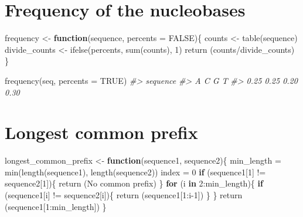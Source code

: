 \documentclass[
]{book}
\newenvironment{Shaded}{\begin{snugshade}}{\end{snugshade}}
\newcommand{\AttributeTok}[1]{\textcolor[rgb]{0.77,0.63,0.00}{#1}}
\newcommand{\CommentTok}[1]{\textcolor[rgb]{0.56,0.35,0.01}{\textit{#1}}}
\newcommand{\ConstantTok}[1]{\textcolor[rgb]{0.00,0.00,0.00}{#1}}
\newcommand{\ControlFlowTok}[1]{\textcolor[rgb]{0.13,0.29,0.53}{\textbf{#1}}}
\newcommand{\DecValTok}[1]{\textcolor[rgb]{0.00,0.00,0.81}{#1}}
\newcommand{\FunctionTok}[1]{\textcolor[rgb]{0.00,0.00,0.00}{#1}}
\newcommand{\NormalTok}[1]{#1}
\newcommand{\OtherTok}[1]{\textcolor[rgb]{0.56,0.35,0.01}{#1}}
\newcommand{\SpecialCharTok}[1]{\textcolor[rgb]{0.00,0.00,0.00}{#1}}
\newcommand{\StringTok}[1]{\textcolor[rgb]{0.31,0.60,0.02}{#1}}
\begin{document}
\hypertarget{frequency-of-the-nucleobases}{%
\section{Frequency of the nucleobases}\label{frequency-of-the-nucleobases}}

\begin{Shaded}
\begin{Highlighting}[]
\NormalTok{frequency }\OtherTok{\textless{}{-}} \ControlFlowTok{function}\NormalTok{(sequence, }\AttributeTok{percents =} \ConstantTok{FALSE}\NormalTok{)\{}
\NormalTok{  counts }\OtherTok{\textless{}{-}} \FunctionTok{table}\NormalTok{(sequence)}
\NormalTok{  divide\_counts }\OtherTok{\textless{}{-}} \FunctionTok{ifelse}\NormalTok{(percents, }\FunctionTok{sum}\NormalTok{(counts), }\DecValTok{1}\NormalTok{)}
  \FunctionTok{return}\NormalTok{ (counts}\SpecialCharTok{/}\NormalTok{divide\_counts)}
\NormalTok{\}}
\end{Highlighting}
\end{Shaded}

\begin{Shaded}
\begin{Highlighting}[]
\FunctionTok{frequency}\NormalTok{(seq, }\AttributeTok{percents =} \ConstantTok{TRUE}\NormalTok{)}
\CommentTok{\#\textgreater{} sequence}
\CommentTok{\#\textgreater{}    A    C    G    T }
\CommentTok{\#\textgreater{} 0.25 0.25 0.20 0.30}
\end{Highlighting}
\end{Shaded}

\hypertarget{longest-common-prefix}{%
\section{Longest common prefix}\label{longest-common-prefix}}

\begin{Shaded}
\begin{Highlighting}[]
\NormalTok{longest\_common\_prefix }\OtherTok{\textless{}{-}} \ControlFlowTok{function}\NormalTok{(sequence1, sequence2)\{}
\NormalTok{  min\_length }\OtherTok{=} \FunctionTok{min}\NormalTok{(}\FunctionTok{length}\NormalTok{(sequence1), }\FunctionTok{length}\NormalTok{(sequence2))}
\NormalTok{  index }\OtherTok{=} \DecValTok{0}
  \ControlFlowTok{if}\NormalTok{ (sequence1[}\DecValTok{1}\NormalTok{] }\SpecialCharTok{!=}\NormalTok{ sequence2[}\DecValTok{1}\NormalTok{])\{}
    \FunctionTok{return}\NormalTok{ (}\StringTok{\textquotesingle{}No common prefix\textquotesingle{}}\NormalTok{)}
\NormalTok{  \}}
  \ControlFlowTok{for}\NormalTok{ (i }\ControlFlowTok{in} \DecValTok{2}\SpecialCharTok{:}\NormalTok{min\_length)\{}
    \ControlFlowTok{if}\NormalTok{ (sequence1[i] }\SpecialCharTok{!=}\NormalTok{ sequence2[i])\{}
      \FunctionTok{return}\NormalTok{ (sequence1[}\DecValTok{1}\SpecialCharTok{:}\NormalTok{i}\DecValTok{{-}1}\NormalTok{])}
\NormalTok{    \}}
\NormalTok{  \}}
  \FunctionTok{return}\NormalTok{ (sequence1[}\DecValTok{1}\SpecialCharTok{:}\NormalTok{min\_length])}
\NormalTok{\}}
\end{Highlighting}
\end{Shaded}
\end{document}

